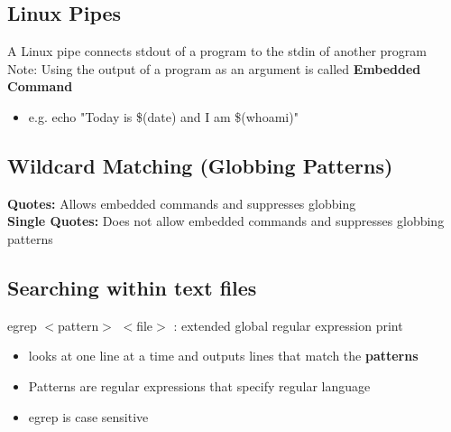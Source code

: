 \documentclass[12pt]{article}
\begin{document}
\subsection{Linux Pipes}
A Linux pipe connects stdout of a program to the stdin of another program \\
Note: Using the output of a program as an argument is called \textbf{Embedded Command}
\begin{itemize}
    \item e.g. echo "Today is \$(date) and I am \$(whoami)"
\end{itemize}

\subsection{Wildcard Matching (Globbing Patterns)}
\textbf{Quotes:} Allows embedded commands and suppresses globbing \\
\textbf{Single Quotes:} Does not allow embedded commands and suppresses globbing patterns 
\subsection{Searching within text files}
egrep $<$pattern$>$ $<$file$>$ : extended global regular expression print
\begin{itemize}
    \item looks at one line at a time and outputs lines that match the \textbf{patterns}
    \item Patterns are regular expressions that specify  regular language
    \item egrep is case sensitive
\end{itemize}
\end{document}
